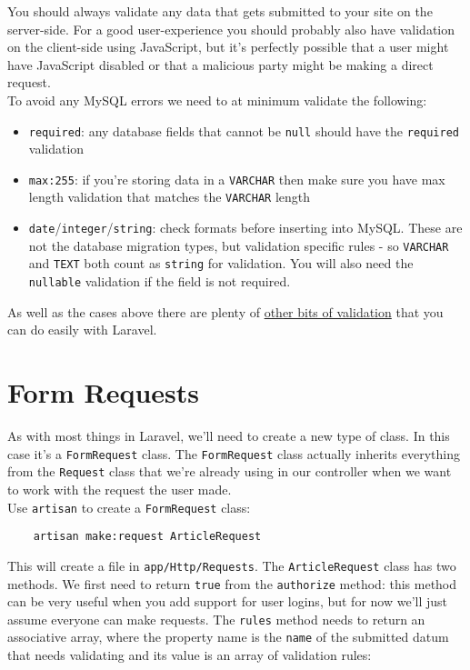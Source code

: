 You should always validate any data that gets submitted to your site on the server-side. For a good user-experience you should probably also have validation on the client-side using JavaScript, but it's perfectly possible that a user might have JavaScript disabled or that a malicious party might be making a direct request.
\\

To avoid any MySQL errors we need to at minimum validate the following:

\begin{itemize}
    \item \texttt{required}: any database fields that cannot be \texttt{null} should have the \texttt{required} validation
    \item \texttt{max:255}: if you're storing data in a \texttt{VARCHAR} then make sure you have max length validation that matches the \texttt{VARCHAR} length
    \item \texttt{date}/\texttt{integer}/\texttt{string}: check formats before inserting into MySQL. These are not the database migration types, but validation specific rules - so \texttt{VARCHAR} and \texttt{TEXT} both count as \texttt{string} for validation. You will also need the \texttt{nullable} validation if the field is not required.
\end{itemize}

As well as the cases above there are plenty of \href{http://laravel.com/docs/master/validation#available-validation-rules}{other bits of validation} that you can do easily with Laravel.

\section{Form Requests}

As with most things in Laravel, we'll need to create a new type of class. In this case it's a \texttt{FormRequest} class. The \texttt{FormRequest} class actually inherits everything from the \texttt{Request} class that we're already using in our controller when we want to work with the request the user made.
\\

Use \texttt{artisan} to create a \texttt{FormRequest} class:

\begin{verbatim}
    artisan make:request ArticleRequest
\end{verbatim}

This will create a file in \texttt{app/Http/Requests}. The \texttt{ArticleRequest} class has two methods. We first need to return \texttt{true} from the \texttt{authorize} method: this method can be very useful when you add support for user logins, but for now we'll just assume everyone can make requests. The \texttt{rules} method needs to return an associative array, where the property name is the \texttt{name} of the submitted datum that needs validating and its value is an array of validation rules:

